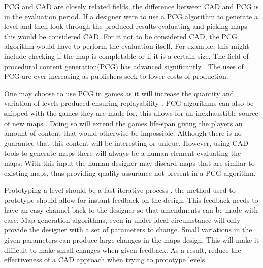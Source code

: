 \documentclass[journal]{IEEEtran}
\begin{document}
 PCG and CAD are closely related fields, the difference between CAD and PCG is in the evaluation period. If a designer were to use a PCG algorithm to generate a level and then look through the produced results evaluating and picking maps this would be considered CAD\cite{liapis2016mixed}. For it not to be considered CAD, the PCG algorithm would have to perform the evaluation itself. For example, this might include checking if the map is completable or if it is a certain size. The field of procedural content generation(PCG) has advanced significantly \cite{van2013designing}. The uses of PCG are ever increasing as publishers seek to lower costs of production\cite{doherty2005mixed, font2016constrained}.

One may choose to use PCG in games as it will increase the quantity and variation of levels produced ensuring replayability \cite{karavolos2015mixed}. PCG algorithms can also be shipped with the games they are made for, this allows for an inexhaustible source of new maps \cite{johnson2010cellular}. Doing so will extend the games life-span giving the players an amount of content that would otherwise be impossible. Although there is no guarantee that this content will be interesting or unique. However, using CAD tools to generate maps there will always be a human element evaluating the maps. With this input the human designer may discard maps that are similar to existing maps, thus providing quality assurance not present in a PCG algorithm.

Prototyping a level should be a fast iterative process \cite{smith2011tanagra}, the method used to prototype should allow for instant feedback on the design. This feedback needs to have an easy channel back to the designer so that amendments can be made with ease. Map generation algorithms, even in under ideal circumstance will only provide the designer with a set of parameters to change\cite{doran2010controlled}. Small variations in the given parameters can produce large changes in the maps design\cite{regier2009random}. This will make it difficult to make small changes when given feedback. As a result, reduce the effectiveness of a CAD approach when trying to prototype levels.
\end{document}
